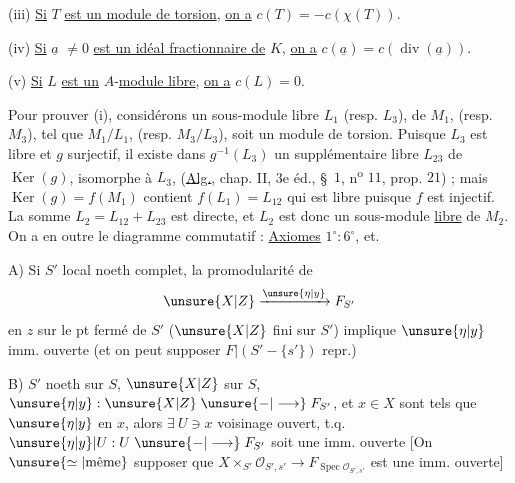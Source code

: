 (iii) \uline{Si} $T$ \uline{est un module de torsion}, \uline{on a} $c(T)=-c(\chi(T))$.

(iv) \uline{Si} $\underline a$ $\ne0$ \uline{est un idéal fractionnaire de} $K$, \uline{on a} $c(\underline a)=c(\operatorname{div}(\underline a))$.

(v) \uline{Si} $L$ \uline{est un} $A$-\uline{module libre}, \uline{on a} $c(L)=0$.

Pour prouver (i), considérons un sous-module libre $L_1$ (resp. $L_3$), de $M_1$, (resp. $M_3$), tel que $M_1/L_1$, (resp. $M_3/L_3$), soit un module de torsion. Puisque $L_3$ est libre et $g$ surjectif, il existe dans $g^{-1}(L_3)$ un supplémentaire libre $L_{23}$ de $\operatorname{Ker}(g)$, isomorphe à $L_3$, (\uline{Alg.}, chap. II, 3e éd., \S\ $1$, n\textsuperscript{o} $11$, prop. $21$) ; mais $\operatorname{Ker}(g)=f(M_1)$ contient $f(L_1)=L_{12}$ qui est libre puisque $f$ est injectif. La somme $L_2=L_{12}+L_{23}$ est directe, et $L_2$ est donc un sous-module \uline{libre} de $M_2$. On a en outre le diagramme commutatif :
\uline{Axiomes} $1^\circ:6^\circ$, et.

A) Si $S'$ local noeth complet,  la promodularité de
\[
 \unsure{X|Z}\xrightarrow{\unsure{\eta|y}}F_{S'}
\]
en $z$ sur le pt fermé de $S'$ ($\unsure{X|Z}$ fini sur $S'$) implique $\unsure{\eta|y}$  imm. ouverte (et on peut supposer $F|(S'-\{s'\})$ repr.)

B)  $S'$ noeth sur $S$, $\unsure{X|Z}$ sur $S$, $\unsure{\eta|y}:\unsure{X|Z}\mathrel{\unsure{-|\longrightarrow}}F_{S'}$, et $x\in X$ sont tels que $\unsure{\eta|y}$  en $x$, alors $\exists\ U\ni x$ voisinage ouvert, t.q. $\unsure{\eta|y}|U:U\mathrel{\unsure{-|\longrightarrow}}F_{S'}$ soit une imm. ouverte [On  $\unsure{\simeq|\text{même}}$ supposer que $X\times_{S'}\mathcal O_{S',s'}\longrightarrow F_{\operatorname{Spec}\mathcal O_{S',s'}}$ est une imm. ouverte]




